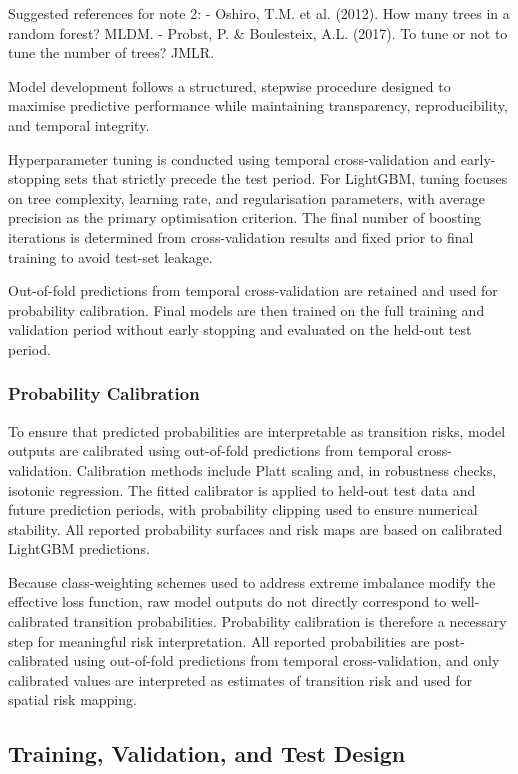 \documentclass[12pt]{article}
\theoremstyle{break} %
\begin{document}
  Suggested references for note 2:
  - Oshiro, T.M. et al. (2012). How many trees in a random forest? MLDM.
  - Probst, P. \& Boulesteix, A.L. (2017). To tune or not to tune the number of trees? JMLR.


Model development follows a structured, stepwise procedure designed to maximise predictive performance while maintaining transparency, reproducibility, and temporal integrity.

Hyperparameter tuning is conducted using temporal cross-validation and early- stopping sets that strictly precede the test period. For LightGBM, tuning focuses on tree complexity, learning rate, and regularisation parameters, with average precision as the primary optimisation criterion. The final number of boosting iterations is determined from cross-validation results and fixed prior to final training to avoid test-set leakage.

Out-of-fold predictions from temporal cross-validation are retained and used for probability calibration. Final models are then trained on the full training and validation period without early stopping and evaluated on the held-out test period.

\subsubsection{Probability Calibration}

To ensure that predicted probabilities are interpretable as transition risks, model outputs are calibrated using out-of-fold predictions from temporal
cross-validation. Calibration methods include Platt scaling and, in robustness checks, isotonic regression. The fitted calibrator is applied to held-out test data and future prediction periods, with probability clipping used to ensure numerical stability. All reported probability surfaces and risk maps are based on calibrated
LightGBM predictions.

Because class-weighting schemes used to address extreme imbalance modify the effective loss function, raw model outputs do not directly correspond to well-calibrated transition probabilities. Probability calibration is therefore a necessary step for meaningful risk interpretation. All reported probabilities are post-calibrated using out-of-fold predictions from temporal cross-validation, and only calibrated values are interpreted as estimates of transition risk and used for spatial risk mapping.

\subsection{Training, Validation, and Test Design}
\label{train-test}
\end{document}
